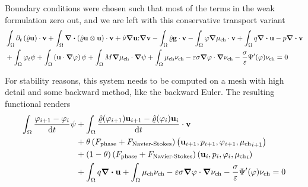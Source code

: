 \documentclass{article} %
\newcommand{\velocity}{\mathbf{u}}
\newcommand{\pressure}{p}
\newcommand{\phase}{\varphi}
\newcommand{\chempot}{\mu_{\text{ch}}}
\newcommand{\test}[1]{%
    \ifthenelse{\equal{#1}{\velocity}}{%
 \mathbf{v}%
 }{%
 \ifthenelse{\equal{#1}{\pressure}}{%
 q%
 }{%
 \ifthenelse{\equal{#1}{\phase}}{%
 \psi%
 }{%
 \ifthenelse{\equal{#1}{\chempot}}{%
 \nu_{\text{ch}}%
 }{%
 #1
 }%
 }%
 }%
 }%
}
\newcommand{\density}{\hat{\varrho}}
\newcommand{\viscosity}{\hat{\nu}}
\newcommand{\gravity}{\mathbf{g}}
\newcommand{\potential}{\Psi}
\begin{document}
Boundary conditions were chosen such that most of the terms in the weak formulation zero out, and we are left with this conservative transport variant
\begin{align*}
    &\int_{\Omega} \partial_t \left(\density \velocity\right) \cdot \test{\velocity} + \int_{\Omega} \div\left(\density \velocity \otimes \velocity\right) \cdot \test{\velocity} + \viscosity \grad{\velocity} \mathbf{:} \grad{\test{\velocity}} - \int_{\Omega} \density \gravity \cdot \test{\velocity} - \int_{\Omega} \phase \grad{\chempot} \cdot \test{\velocity} + \int_{\Omega} \test{\pressure} \div{\velocity} - \pressure \div{\test{\velocity}} \\
    & + \int_{\Omega} \phase_t \test{\phase} + \int_{\Omega} \left(\velocity \cdot \grad{\phase}\right) \test{\phase} + \int_{\Omega} M \grad{\chempot} \cdot \grad{\test{\phase}} + \int_{\Omega} \chempot \test{\chempot} - \varepsilon \sigma \grad{\phase} \cdot \grad{\test{\chempot}} - \frac{\sigma}{\varepsilon} \potential'(\phase) \test{\chempot} = 0
\end{align*}


For stability reasons, this system needs to be computed on a mesh with high detail and some backward method, like the backward Euler. The resulting functional renders
\begin{align*}
    \int_{\Omega} \frac{\phase_{i + 1} - \phase_i}{\dd{t}} \test{\phase} &+ \int_{\Omega} \frac{\density(\phase_{i + 1}) \velocity_{i+1} - \density(\phase_i) \velocity_i}{\dd{t}} \cdot \test{\velocity} \\
    &+ \theta\left(F_{\text{phase}} + F_{\text{Navier-Stokes}}\right)\left(\velocity_{i+1}, \pressure_{i+1}, \phase_{i+1}, {\chempot}_{i+1}\right)\\
    &+ (1 - \theta)\left(F_{\text{phase}} + F_{\text{Navier-Stokes}}\right)\left(\velocity_{i}, \pressure_{i}, \phase_{i}, {\chempot}_{i}\right) \\
    &+ \int_{\Omega} {\test{\pressure}} \div{\velocity} + \int_{\Omega} \chempot \test{\chempot} - \varepsilon \sigma \grad{\phase} \cdot \grad{\test{\chempot}} - \frac{\sigma}{\varepsilon} \potential'(\phase) \test{\chempot} = 0
\end{align*}



\printbibliography
\end{document}
